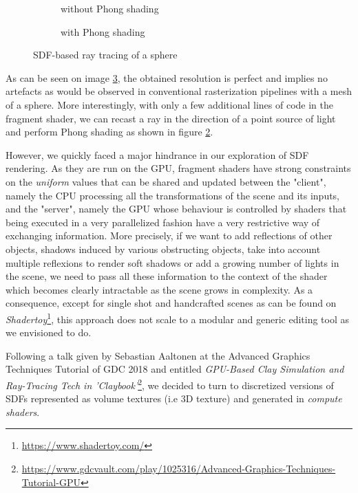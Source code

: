 \documentclass[10pt,a4paper,english, twocolumn]{article}
\begin{document}
\begin{figure}
    \begin{subfigure}{.5\linewidth}
        \centering
        \caption{without Phong shading}
        \label{sfig:sphere-tracing1}
    \end{subfigure}%
    \begin{subfigure}{.5\linewidth}
        \centering
        \caption{with Phong shading}
        \label{sfig:sphere-tracing2}
    \end{subfigure}
    \caption{SDF-based ray tracing of a sphere}
    \label{fig:sphere-tracing}
\end{figure}

As can be seen on image \ref{fig:sphere-tracing}, the obtained resolution is perfect and implies no artefacts as would be observed in conventional rasterization pipelines with a mesh of a sphere. More interestingly, with only a few additional lines of code in the fragment shader, we can recast a ray in the direction of a point source of light and perform Phong shading as shown in figure \ref{sfig:sphere-tracing2}.

However, we quickly faced a major hindrance in our exploration of SDF rendering. As they are run on the GPU, fragment shaders have strong constraints on the \textit{uniform} values that can be shared and updated between the "client", namely the CPU processing all the transformations of the scene and its inputs, and the "server", namely the GPU whose behaviour is controlled by shaders that being executed in a very parallelized fashion have a very restrictive way of exchanging information. More precisely, if we want to add reflections of other objects, shadows induced by various obstructing objects, take into account multiple reflexions to render soft shadows or add a growing number of lights in the scene, we need to pass all these information to the context of the shader which becomes clearly intractable as the scene grows in complexity. As a consequence, except for single shot and handcrafted scenes as can be found on \textit{Shadertoy}\footnote{\url{https://www.shadertoy.com/}}, this approach does not scale to a modular and generic editing tool as we envisioned to do.

Following a talk given by Sebastian Aaltonen at the Advanced Graphics Techniques Tutorial of GDC 2018 and entitled \textit{GPU-Based Clay Simulation and Ray-Tracing Tech in 'Claybook'}\footnote{\url{https://www.gdcvault.com/play/1025316/Advanced-Graphics-Techniques-Tutorial-GPU}}, we decided to turn to discretized versions of SDFs represented as volume textures (i.e 3D texture) and generated in \textit{compute shaders}.
\end{document}

